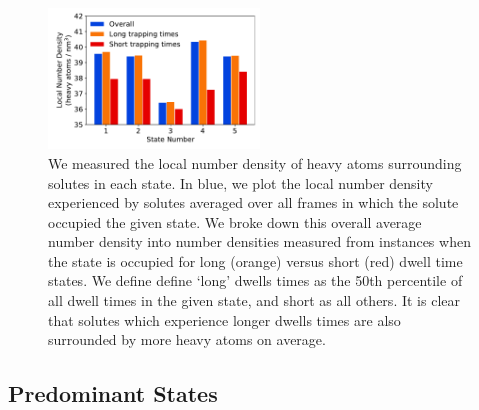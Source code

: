 \documentclass{article}
\begin{document}
  \begin{figure}[h]
  \centering
  \includegraphics[width=0.5\textwidth]{local_densities.pdf}
  \caption{We measured the local number density of heavy atoms surrounding solutes in each
  state. In blue, we plot the local number density experienced by solutes averaged over all
  frames in which the solute occupied the given state. We broke down this overall average 
  number density into number densities measured from instances when the state is occupied 
  for long (orange) versus short (red) dwell time states. We define define `long' dwells times
  as the 50th percentile of all dwell times in the given state, and short as all others. It
  is clear that solutes which experience longer dwells times are also surrounded by more 
  heavy atoms on average.}\label{fig:local_densities}
  \end{figure}
  
  \subsection{Predominant States}\label{section:state_prevelance}
  
\end{document}
